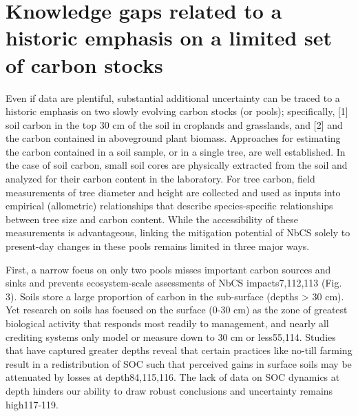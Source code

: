 \documentclass[
  letterpaper,
  DIV=11,
  numbers=noendperiod]{scrreprt}
\begin{document}
\hypertarget{sec-carbon}{%
\section{Knowledge gaps related to a historic emphasis on a limited set
of carbon stocks}\label{sec-carbon}}

Even if data are plentiful, substantial additional uncertainty can be
traced to a historic emphasis on two slowly evolving carbon stocks (or
pools); specifically, {[}1{]} soil carbon in the top 30 cm of the soil
in croplands and grasslands, and {[}2{]} and the carbon contained in
aboveground plant biomass. Approaches for estimating the carbon
contained in a soil sample, or in a single tree, are well established.
In the case of soil carbon, small soil cores are physically extracted
from the soil and analyzed for their carbon content in the laboratory.
For tree carbon, field measurements of tree diameter and height are
collected and used as inputs into empirical (allometric) relationships
that describe species-specific relationships between tree size and
carbon content. While the accessibility of these measurements is
advantageous, linking the mitigation potential of NbCS solely to
present-day changes in these pools remains limited in three major ways.

First, a narrow focus on only two pools misses important carbon sources
and sinks and prevents ecosystem-scale assessments of NbCS
impacts7,112,113 (Fig. 3). Soils store a large proportion of carbon in
the sub-surface (depths \textgreater{} 30 cm). Yet research on soils has
focused on the surface (0-30 cm) as the zone of greatest biological
activity that responds most readily to management, and nearly all
crediting systems only model or measure down to 30 cm or less55,114.
Studies that have captured greater depths reveal that certain practices
like no-till farming result in a redistribution of SOC such that
perceived gains in surface soils may be attenuated by losses at
depth84,115,116. The lack of data on SOC dynamics at depth hinders our
ability to draw robust conclusions and uncertainty remains high117-119.
\end{document}
